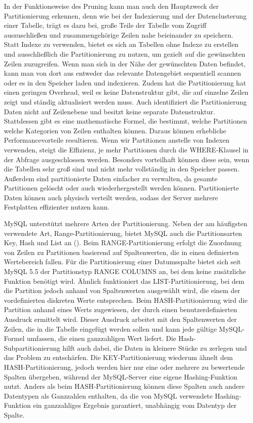 In der Funktionsweise des Pruning kann man auch den Hauptzweck der Partitionierung erkennen, denn wie bei der Indexierung und der Datenclusterung einer Tabelle, trägt es dazu bei, große Teile der Tabelle vom Zugriff auszuschließen und zusammengehörige Zeilen nahe beieinander zu speichern.
Statt Indexe zu verwenden, bietet es sich an Tabellen ohne Indexe zu erstellen und ausschließlich die Partitionierung zu nutzen, um gezielt auf die gewünschten Zeilen zuzugreifen.
Wenn man sich in der Nähe der gewünschten Daten befindet, kann man von dort aus entweder das relevante Datengebiet sequentiell scannen oder es in den Speicher laden und indexieren.
Zudem hat die Partitionierung hat einen geringen Overhead, weil es keine Datenstruktur gibt, die auf einzelne Zeilen zeigt und ständig aktualisiert werden muss.
Auch identifiziert die Partitionierung Daten nicht auf Zeilenebene und besitzt keine separate Datenstruktur.
Stattdessen gibt es eine mathematische Formel, die bestimmt, welche Partitionen welche Kategorien von Zeilen enthalten können.
Daraus können erhebliche Performancevorteile resultieren.
Wenn wir Partitionen anstelle von Indexen verwenden, steigt die Effizienz, je mehr Partitionen durch die WHERE-Klausel in der Abfrage ausgeschlossen werden.
Besonders vorteilhaft können diese sein, wenn die Tabellen sehr groß sind und nicht mehr vollständig in den Speicher passen.
Außerdem sind partitionierte Daten einfacher zu verwalten, da gesamte Partitionen gelöscht oder auch wiederhergestellt werden können.
Partitionierte Daten können auch physisch verteilt werden, sodass der Server mehrere Festplatten effizienter nutzen kann.

MySQL unterstützt mehrere Arten der Partitionierung.
Neben der am häufigsten verwendete Art, Range-Partitionierung, bietet MySQL auch die Partitionsarten Key, Hash und List an (\cite{mysql_partition_types}).
Beim RANGE-Partitionierung erfolgt die Zuordnung von Zeilen zu Partitionen basierend auf Spaltenwerten, die in einen definierten Wertebereich fallen.
Für die Partitionierung einer Datumsspalte bietet sich seit MySQL 5.5 der Partitionstyp RANGE COLUMNS an, bei dem keine zusätzliche Funktion benötigt wird.
Ähnlich funktioniert das LIST-Partitionierung, bei dem die Partition jedoch anhand von Spaltenwerten ausgewählt wird, die einem der vordefinierten diskreten Werte entsprechen.
Beim HASH-Partitionierung wird die Partition anhand eines Werts zugewiesen, der durch einen benutzerdefinierten Ausdruck ermittelt wird.
Dieser Ausdruck arbeitet mit den Spaltenwerten der Zeilen, die in die Tabelle eingefügt werden sollen und kann jede gültige MySQL-Formel umfassen, die einen ganzzahligen Wert liefert.
Die Hash-Subpartitionierung hilft auch dabei, die Daten in kleinere Stücke zu zerlegen und das Problem zu entschärfen.
Die KEY-Partitionierung wiederum ähnelt dem HASH-Partitionierung, jedoch werden hier nur eine oder mehrere zu bewertende Spalten übergeben, während der MySQL-Server eine eigene Hashing-Funktion nutzt.
Anders als beim HASH-Partitionierung können diese Spalten auch andere Datentypen als Ganzzahlen enthalten, da die von MySQL verwendete Hashing-Funktion ein ganzzahliges Ergebnis garantiert, unabhängig vom Datentyp der Spalte.

